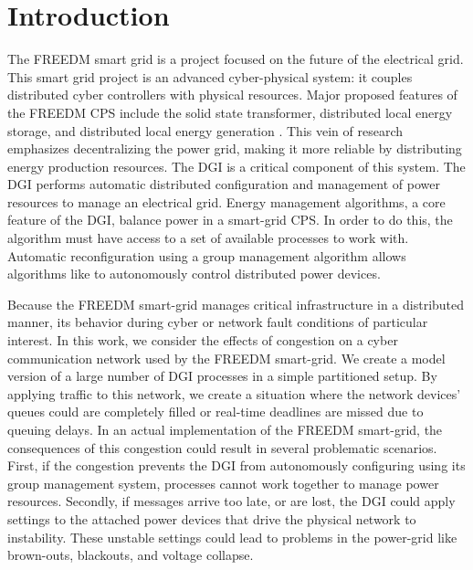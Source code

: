 
\section{Introduction}

The \ac{FREEDM} smart grid is a project focused on the future of the electrical grid.
This smart grid project is an advanced cyber-physical system: it couples distributed cyber controllers with physical resources.
Major proposed features of the \ac{FREEDM} \ac{CPS} include the solid state transformer, distributed local energy storage, and distributed local energy generation \cite{FREEDMMIGRATION}.
This vein of research emphasizes decentralizing the power grid, making it more reliable by distributing energy production resources.
The \ac{DGI} is a critical component of this system.
The \ac{DGI} performs automatic distributed configuration and management of power resources to manage an electrical grid.
Energy management algorithms, a core feature of the \ac{DGI}\cite{LOADBALANCING}, balance power in a smart-grid \ac{CPS}.
In order to do this, the algorithm must have access to a set of available processes to work with.
Automatic reconfiguration using a group management algorithm allows algorithms like \cite{LOADBALANCING}\cite{ICC1}\cite{MOYEEN} to autonomously control distributed power devices.

Because the \ac{FREEDM} smart-grid manages critical infrastructure in a distributed manner, its behavior during cyber or network fault conditions of particular interest.
In this work, we consider the effects of congestion on a cyber communication network used by the \ac{FREEDM} smart-grid.
We create a model version of a large number of \ac{DGI} processes in a simple partitioned setup.
By applying traffic to this network, we create a situation where the network devices' queues could are completely filled or real-time deadlines are missed due to queuing delays.
In an actual implementation of the \ac{FREEDM} smart-grid, the consequences of this congestion could result in several problematic scenarios.
First, if the congestion prevents the \ac{DGI} from autonomously configuring using its group management system, processes cannot work together to manage power resources.
Secondly, if messages arrive too late, or are lost, the \ac{DGI} could apply settings to the attached power devices that drive the physical network to instability.
These unstable settings could lead to problems in the power-grid like brown-outs, blackouts, and voltage collapse.

